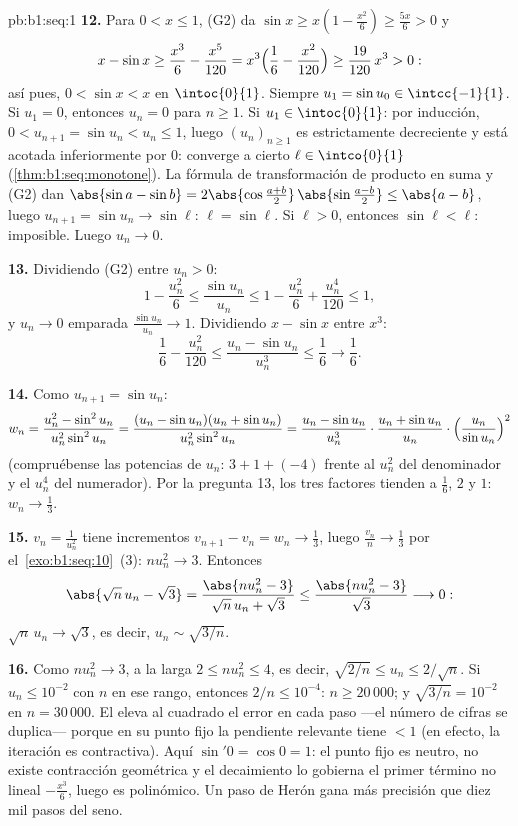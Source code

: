 \begin{solution}{pb:b1:seq:1}
\textbf{12.} Para $0 < x \leq 1$, (G2) da
$\sin x \geq x(1 - \frac{x^2}{6}) \geq \frac{5x}{6} > 0$ y
\[
x - \sin x \geq \frac{x^3}{6} - \frac{x^5}{120}
= x^3\Bigl(\frac16 - \frac{x^2}{120}\Bigr)
\geq \frac{19}{120}\,x^3 > 0 :
\]
así pues, $0 < \sin x < x$ en $\intoc{0}{1}$. Siempre
$u_1 = \sin u_0 \in \intcc{-1}{1}$. Si $u_1 = 0$, entonces $u_n = 0$
para $n \geq 1$. Si $u_1 \in \intoc{0}{1}$: por inducción,
$0 < u_{n+1} = \sin u_n < u_n \leq 1$, luego $(u_n)_{n\geq1}$ es
estrictamente decreciente y está acotada inferiormente por $0$:
converge a cierto $\ell \in \intco{0}{1}$
(\cref{thm:b1:seq:monotone}). La fórmula de transformación de producto
en suma y (G2) dan $\abs{\sin a - \sin b} = 2\abs{\cos
\frac{a+b}{2}}\,\abs{\sin\frac{a-b}{2}} \leq \abs{a - b}$, luego
$u_{n+1} = \sin u_n \to \sin \ell$: $\ell = \sin\ell$. Si $\ell > 0$,
entonces $\sin\ell < \ell$: imposible. Luego $u_n \to 0$.

\textbf{13.} Dividiendo (G2) entre $u_n > 0$:
\[
1 - \frac{u_n^2}{6} \leq \frac{\sin u_n}{u_n} \leq 1 -
\frac{u_n^2}{6} + \frac{u_n^4}{120} \leq 1 ,
\]
y $u_n \to 0$ emparada $\frac{\sin u_n}{u_n} \to 1$. Dividiendo
$x - \sin x$ entre $x^3$:
\[
\frac16 - \frac{u_n^2}{120} \leq \frac{u_n - \sin u_n}{u_n^3}
\leq \frac16 \longrightarrow \frac16 .
\]

\textbf{14.} Como $u_{n+1} = \sin u_n$:
\[
w_n = \frac{u_n^2 - \sin^2 u_n}{u_n^2 \sin^2 u_n}
= \frac{(u_n - \sin u_n)(u_n + \sin u_n)}{u_n^2 \sin^2 u_n}
= \frac{u_n - \sin u_n}{u_n^3}\cdot
\frac{u_n + \sin u_n}{u_n}\cdot
\Bigl(\frac{u_n}{\sin u_n}\Bigr)^{2}
\]
(compruébense las potencias de $u_n$: $3 + 1 + (-4)$ frente al $u_n^2$
del denominador y el $u_n^4$ del numerador). Por la pregunta 13, los
tres factores tienden a $\frac16$, $2$ y $1$: $w_n \to \frac13$.

\textbf{15.} $v_n = \frac{1}{u_n^2}$ tiene incrementos
$v_{n+1} - v_n = w_n \to \frac13$, luego $\frac{v_n}{n} \to \frac13$
por el~\cref{exo:b1:seq:10}~(3): $n u_n^2 \to 3$. Entonces
\[
\abs{\sqrt n\,u_n - \sqrt 3}
= \frac{\abs{n u_n^2 - 3}}{\sqrt n\,u_n + \sqrt 3}
\leq \frac{\abs{n u_n^2 - 3}}{\sqrt 3} \longrightarrow 0 :
\]
$\sqrt n\,u_n \to \sqrt 3$, es decir, $u_n \sim \sqrt{3/n}$.

\textbf{16.} Como $n u_n^2 \to 3$, a la larga $2 \leq n u_n^2 \leq 4$,
es decir, $\sqrt{2/n} \leq u_n \leq 2/\sqrt n$. Si $u_n \leq 10^{-2}$
con $n$ en ese rango, entonces $2/n \leq 10^{-4}$: $n \geq 20\,000$; y
$\sqrt{3/n} = 10^{-2}$ en $n = 30\,000$. El  eleva al
cuadrado el error en cada paso ---el número de cifras se duplica---
porque en su punto fijo la pendiente relevante tiene  $< 1$ (en
efecto, la iteración es contractiva). Aquí $\sin' 0 = \cos 0 = 1$: el
punto fijo es neutro, no existe contracción geométrica y el
decaimiento lo gobierna el primer término no lineal
$-\frac{x^3}{6}$, luego es polinómico. Un paso de Herón gana más
precisión que diez mil pasos del seno.


\end{solution}
